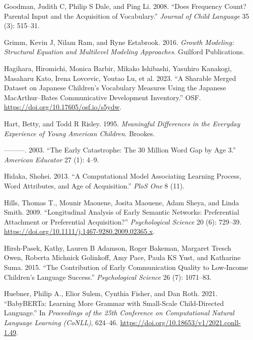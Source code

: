 \documentclass[
  11pt,
]{article}
\newlength{\cslhangindent}
\newenvironment{CSLReferences}[2] %
 {\begin{list}{}{%
  \setlength{\itemindent}{0pt}
  \setlength{\leftmargin}{0pt}
  \setlength{\parsep}{0pt}
  \ifodd #1
   \setlength{\leftmargin}{\cslhangindent}
   \setlength{\itemindent}{-1\cslhangindent}
  \fi
  \setlength{\itemsep}{#2\baselineskip}}}
 {\end{list}}
\begin{document}
\begin{CSLReferences}{1}{0}
Goodman, Judith C, Philip S Dale, and Ping Li. 2008. {``Does Frequency
Count? Parental Input and the Acquisition of Vocabulary.''}
\emph{Journal of Child Language} 35 (3): 515--31.

Grimm, Kevin J, Nilam Ram, and Ryne Estabrook. 2016. \emph{Growth
Modeling: Structural Equation and Multilevel Modeling Approaches}.
Guilford Publications.

Hagihara, Hiromichi, Monica Barbir, Mikako Ishibashi, Yasuhiro Kanakogi,
Masaharu Kato, Irena Lovcevic, Youtao Lu, et al. 2023. {``A Sharable
Merged Dataset on {Japanese} Children's Vocabulary Measures Using the
{Japanese} {MacArthur}--{Bates} {Communicative} {Development}
{Inventory}.''} OSF. \url{https://doi.org/10.17605/osf.io/s5ydw}.

Hart, Betty, and Todd R Risley. 1995. \emph{Meaningful Differences in
the Everyday Experience of Young American Children}. Brookes.

---------. 2003. {``The Early Catastrophe: The 30 Million Word Gap by
Age 3.''} \emph{American Educator} 27 (1): 4--9.

Hidaka, Shohei. 2013. {``A Computational Model Associating Learning
Process, Word Attributes, and Age of Acquisition.''} \emph{PloS One} 8
(11).

Hills, Thomas T., Mounir Maouene, Josita Maouene, Adam Sheya, and Linda
Smith. 2009. {``Longitudinal Analysis of Early Semantic Networks:
Preferential Attachment or Preferential Acquisition?''}
\emph{Psychological Science} 20 (6): 729--39.
\url{https://doi.org/10.1111/j.1467-9280.2009.02365.x}.

Hirsh-Pasek, Kathy, Lauren B Adamson, Roger Bakeman, Margaret Tresch
Owen, Roberta Michnick Golinkoff, Amy Pace, Paula KS Yust, and Katharine
Suma. 2015. {``The Contribution of Early Communication Quality to
Low-Income Children's Language Success.''} \emph{Psychological Science}
26 (7): 1071--83.

Huebner, Philip A., Elior Sulem, Cynthia Fisher, and Dan Roth. 2021.
{``{BabyBERTa}: Learning More Grammar with Small-Scale Child-Directed
Language.''} In \emph{Proceedings of the 25th Conference on
Computational Natural Language Learning (CoNLL)}, 624--46.
\url{https://doi.org/10.18653/v1/2021.conll-1.49}.


\end{CSLReferences}
\end{document}
